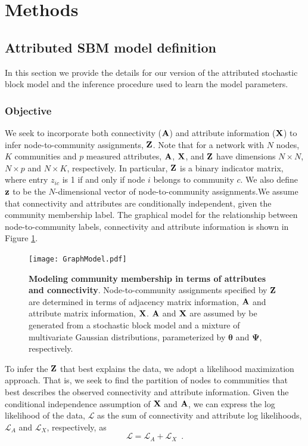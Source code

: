 \section{Methods}

\subsection{Attributed SBM model definition}
 In this section we provide the details for our version of the attributed stochastic block model and the inference procedure used to learn the model parameters. 

\subsubsection{Objective}
We seek to incorporate both connectivity (${\bf A}$) and attribute information (${\bf X}$) to infer node-to-community assignments, ${\bf Z}$. Note that for a network with $N$ nodes, $K$ communities and $p$ measured attributes, ${\bf A}$, ${\bf X}$, and ${\bf Z}$ have dimensions $N \times N$, $N \times p$ and $N \times K$, respectively. In particular, ${\bf Z}$ is a binary indicator matrix, where entry $z_{ic}$ is 1 if and only if node $i$ belongs to community $c$. We also define ${\bf z}$ to be the $N$-dimensional vector of node-to-community assignments.We assume that connectivity and attributes are conditionally independent, given the community membership label. The graphical model for the relationship between node-to-community labels, connectivity and attribute information is shown in Figure \ref{fig:graphical_model}.

\begin{figure}
\begin{center}
\texttt{[image: GraphModel.pdf]}
\caption{{\bf Modeling community membership in terms of attributes and connectivity}. Node-to-community assignments specified by ${\bf Z}$ are determined in terms of adjacency matrix information, ${\bf A}$ and attribute matrix information, ${\bf X}$. ${\bf A}$ and ${\bf X}$ are assumed by be generated from a stochastic block model and a mixture of multivariate Gaussian distributions, parameterized by ${\boldsymbol \theta}$ and ${\boldsymbol \Psi}$, respectively.
\label{fig:graphical_model}} 
\end{center}
\end{figure}

To infer the ${\bf Z}$ that best explains the data, we adopt a likelihood maximization approach. That is, we seek to find the partition of nodes to communities that best describes the observed connectivity and attribute information.  Given the conditional independence assumption of ${\bf X}$ and ${\bf A}$, we can express the log likelihood of the data, ${\mathcal L}$ as the sum of connectivity and attribute log likelihoods, ${\mathcal L}_{A}$ and ${\mathcal L}_{X}$, respectively,
as
\begin{equation}
\mathcal{L}=\mathcal{L}_{A}+\mathcal{L}_{X}\enspace.
\label{eqn:likelihood_decomposition}
\end{equation}

